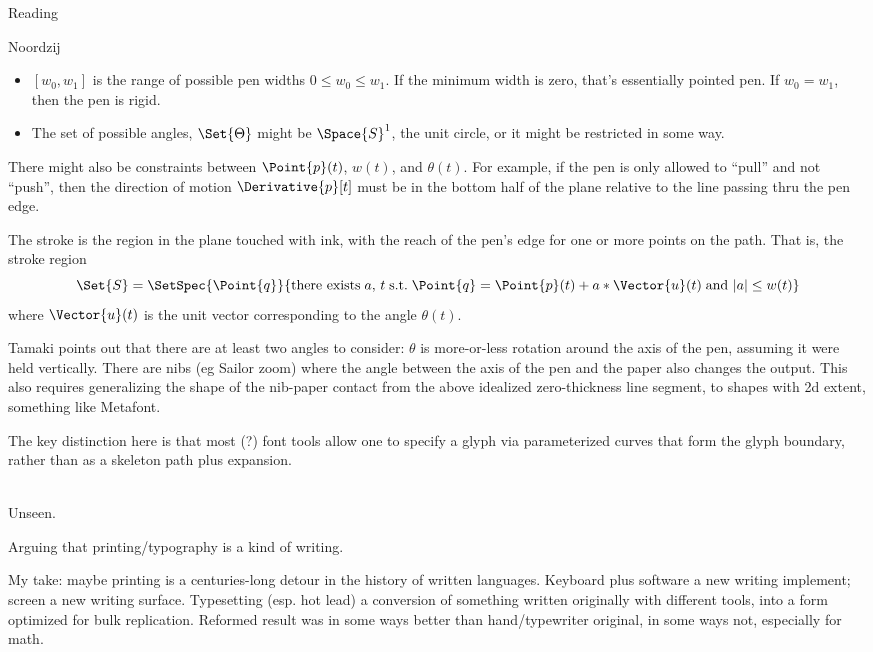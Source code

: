 \documentclass[11pt]{PalisadesLakesBook}
\begin{document}
\begin{plSection}{Reading}
\begin{plSection}{Noordzij}
\begin{itemize}
  \item $\left[ w_{0}, w_{1} \right]$ is 
the range of possible pen widths $0 \leq w_{0} \leq w_{1}$.
If the minimum width is zero, that's essentially pointed pen.
If $w_{0}=w_{1}$, then the pen is rigid.

  \item The set of possible angles, $\Set{\Theta}$
  might be $\Space{S}^{1}$, the unit circle,
  or it might be restricted in some way. 
\end{itemize}
There might also be constraints between 
$\Point{p}(t)$, $w(t)$, and $\theta(t)$.
For example, if the pen is only allowed to ``pull''
and not ``push'', then the direction of motion 
$\Derivative{p}[t]$ must be in the bottom half of the 
plane relative to the line passing thru the pen edge.

The stroke is the region in the plane touched with ink,
with the reach of the pen's edge for one or more points 
on the path.
That is, the stroke region 
\begin{equation}
\Set{S} = 
\SetSpec{\Point{q}}{\text{there exists} \; a,\,t \; \text{s.t.} \; 
\Point{q} = \Point{p}(t) + a*\Vector{u}(t) \;\text{and}\ 
|a| \leq w(t)
}
\end{equation}
where $\Vector{u}(t)$ is the unit vector corresponding to the
angle $\theta(t)$.

Tamaki points out that there are at least two angles to consider:
$\theta$ is more-or-less rotation around the axis of the pen,
assuming it were held vertically.
There are nibs (eg Sailor zoom) 
where the angle between the axis of the pen and the paper
also changes the output.
This also requires generalizing the shape of the nib-paper contact
from the above idealized zero-thickness line segment,
to shapes with 2d extent, something like Metafont.

The key distinction here is that most (?) font tools
allow one to specify a glyph via parameterized curves that form
the glyph boundary, rather than as a skeleton path plus expansion.


\\

Unseen.


Arguing that printing/typography is a kind of writing.

My take: maybe printing is a centuries-long detour
in the history of written languages. 
Keyboard plus software a new writing implement;
screen a new writing surface.
Typesetting (esp. hot lead) a conversion of something written
originally with different tools, 
into a form optimized for bulk replication.
Reformed result was in some ways better 
than hand/typewriter original,
in some ways not, especially for math. 



\end{plSection}
\end{plSection}
\end{document}
